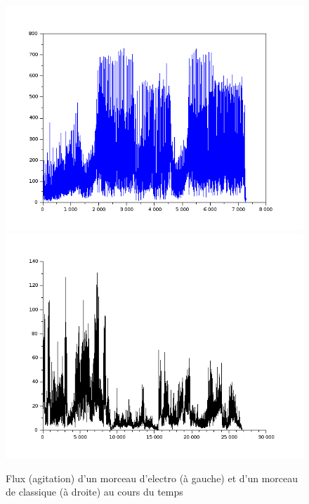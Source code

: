 \documentclass[a4paper]{article}
\begin{document}
\begin{figure}[h!]
\begin{center}
\includegraphics[scale=0.3]{../fluxvexento.png}
\includegraphics[scale=0.3]{../fluxvivaldi.png}
\caption{Flux (agitation) d'un morceau d'electro (à gauche) et d'un morceau de classique (à droite) au cours du temps}
\end{center}
\end{figure}
\end{document}
